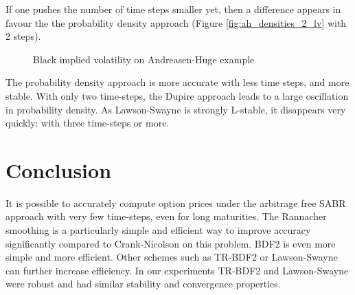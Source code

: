 \documentclass[]{rAMF2e}
\begin{document}
If one pushes the number of time steps smaller yet, then a difference appears in favour the the probability density approach (Figure \ref{fig:ah_densities_2_lv} with 2 steps).
\begin{figure}[htb]
  \begin{center}  
    \end{center}
     \caption{\label{fig:ah_impliedvols_lv} Black implied volatility on Andreasen-Huge example}
\end{figure}

The probability density approach is more accurate with less time steps, and more stable. With only two time-steps, the Dupire approach leads to a large oscillation in probability density. As Lawson-Swayne is strongly L-stable, it disappears very quickly: with three time-steps or more.


\section{Conclusion}
It is possible to accurately compute option prices under the arbitrage free SABR approach with very few time-steps, even for long maturities. The Rannacher smoothing is a particularly simple and efficient way to improve accuracy significantly compared to Crank-Nicolson on this problem. BDF2 is even more simple and more efficient. Other schemes such as TR-BDF2 or Lawson-Swayne can further increase efficiency. In our experiments TR-BDF2 and Lawson-Swayne were robust and had similar stability and convergence properties.
\end{document}
